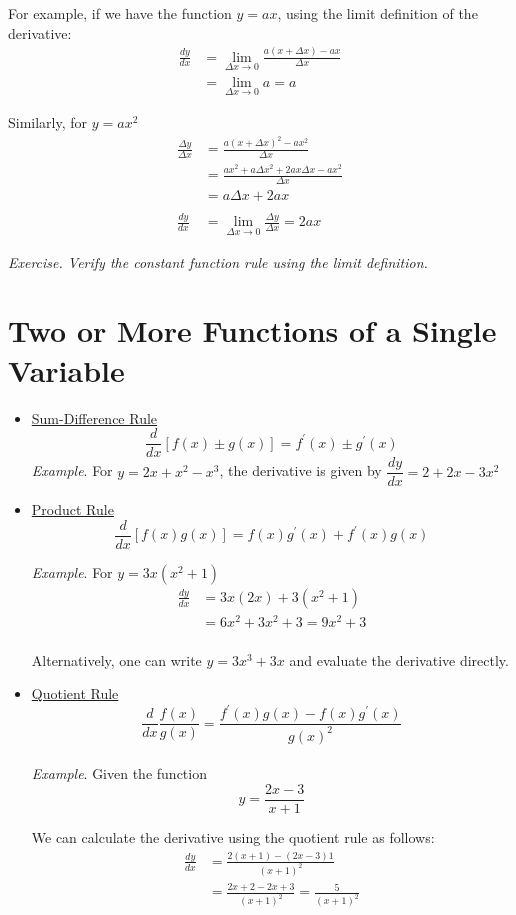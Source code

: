 \documentclass{./../../Latex/handout}
\begin{document}
For {example}, if we have the function $y=ax$, using the limit definition of the derivative: 
$$ \begin{aligned} \frac{d y}{d x} &=\lim _{\Delta x \rightarrow 0} \frac{a(x+\Delta x)-a x}{\Delta x} \\ &=\lim _{\Delta x \rightarrow 0} a=a \end{aligned} $$

Similarly, for $y=ax^2$
$$
\begin{aligned}
\frac{\Delta y}{\Delta x} &=\frac{a(x+\Delta x)^{2}-a x^{2}}{\Delta x} \\
&=\frac{a x^{2}+a \Delta x^{2}+2 a x \Delta x-a x^{2}}{\Delta x} \\
&=a \Delta x+2a x \\~\\
\frac{d y}{d x}&=\lim _{\Delta x \rightarrow 0} \frac{\Delta y}{\Delta x} =2 ax
\end{aligned}
$$

\textit{Exercise. Verify the constant function rule using the limit definition.}

\newpage
\section*{Two or More Functions of a Single Variable}
\begin{itemize}
\item \underline{Sum-Difference Rule}
$$ \frac{d}{d x}[f(x) \pm g(x)]=f^{\prime}(x) \pm g^{\prime}(x) $$
\textit{Example}. For $y=2x+x^2- x^{3}$, the derivative is given by $ \dfrac{d y}{d x}=2+2x-3x^2 $ \\

\item \underline{Product Rule}
$$
\frac{d}{d x}[f(x) g(x)]=f(x) g^{\prime}(x)+f^{\prime}(x) g(x)
$$ 

\textit{Example}. For  \( y =3 x\left(x^{2}+1\right) \)\\
\[
\begin{aligned}
\frac{dy}{d x} &=3 x(2 x)+3\left(x^{2}+1\right) \\
&=6 x^{2}+3x^2+3 = 9 x^2+3
\end{aligned}
\]\\
Alternatively, one can write \( y =3x^3+3x \) and evaluate the derivative directly. \\
\item \underline{Quotient Rule}
$$ \frac{d}{d x} \frac{f(x)}{g(x)}=\frac{f^{\prime}(x) g(x)-f(x) g^{\prime}(x)}{g(x)^2} $$ \\
\textit{Example}. Given the function $$
y=\frac{2 x-3}{x+1}
$$

We can calculate the derivative using the quotient rule as follows:
$$
\begin{aligned}
\frac{d y}{d x} &=\frac{2(x+1)-(2 x-3) 1}{(x+1)^{2}} \\
&=\frac{2 x+2-2 x+3}{(x+1)^{2}}=\frac{5}{(x+1)^{2}}
\end{aligned}
$$
\end{itemize}
\end{document}
